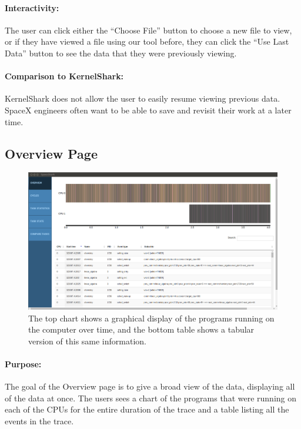 \documentclass{hmcclinic}
\begin{document}
\paragraph{Interactivity:}
The user can click either the ``Choose File'' button to choose a new file to view, or if they have viewed a file using our tool before, they can click the ``Use Last Data'' button to see the data that they were previously viewing.

\paragraph{Comparison to KernelShark:}
KernelShark does not allow the user to easily resume viewing previous data. SpaceX engineers often want to be able to save and revisit their work at a later time. 


  \subsection{Overview Page} 
  
  \begin{figure}[H]
  \centering
      \includegraphics[width=5in]{overview-page.png}
  \caption{The top chart shows a graphical display of the programs running on the computer over time, and the bottom table shows a tabular version of this same information.}
  \end{figure}

\paragraph{Purpose:} 
The goal of the Overview page is to give a broad view of the data, displaying
all of the data at once.  The users sees a chart of the programs that were
running on each of the CPUs for the entire duration of the trace and a table
listing all the events in the trace.
\end{document}
